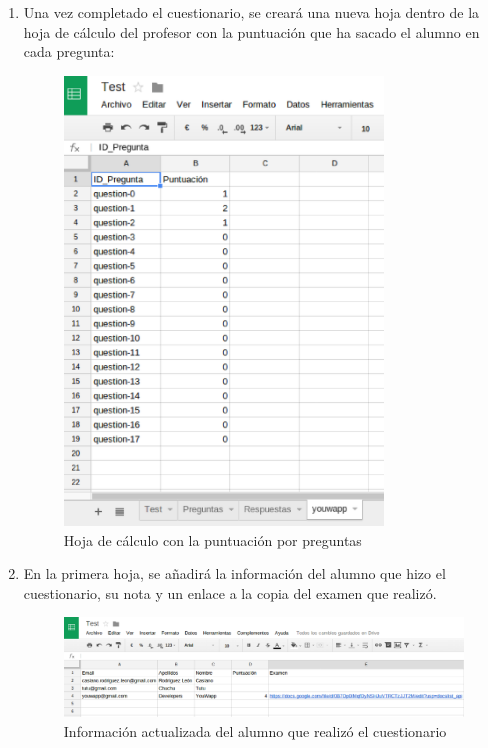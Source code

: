 \begin{enumerate}
  \item Una vez completado el cuestionario, se crear\'a una nueva hoja dentro de la hoja de c\'alculo del profesor con la puntuaci\'on que ha
  sacado el alumno en cada pregunta:
  \begin{figure}[!th]
  \begin{center}
  \includegraphics[width=0.8\textwidth]{images/app15.eps}
  \caption{Hoja de c\'alculo con la puntuaci\'on por preguntas}
  \label{fig:app15}
  \end{center}
  \end{figure}
  \newpage
  
  \item En la primera hoja, se a\~{n}adir\'a la informaci\'on del alumno que hizo el cuestionario, su nota y un enlace a la copia del examen que realiz\'o.
  \begin{figure}[!th]
  \begin{center}
  \includegraphics[width=1.1\textwidth]{images/app16.eps}
  \caption{Informaci\'on actualizada del alumno que realiz\'o el cuestionario}
  \label{fig:app16}
  \end{center}
  \end{figure}
  

\end{enumerate}
